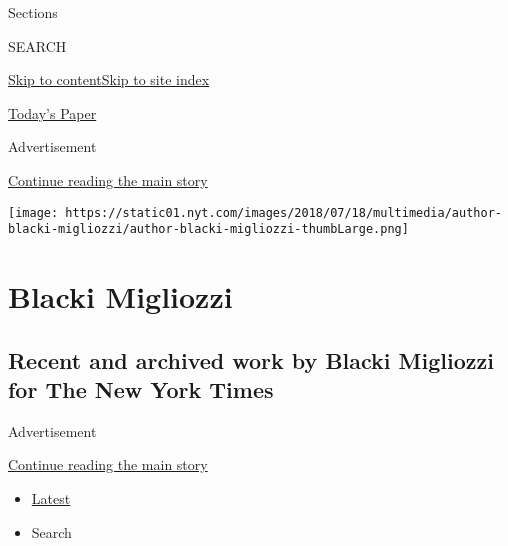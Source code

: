 Sections

SEARCH

\protect\hyperlink{site-content}{Skip to
content}\protect\hyperlink{site-index}{Skip to site index}

\href{https://myaccount.nytimes.com/auth/login?response_type=cookie\&client_id=vi}{}

\href{https://www.nytimes.com/section/todayspaper}{Today's Paper}

Advertisement

\protect\hyperlink{after-top}{Continue reading the main story}

\texttt{[image: https://static01.nyt.com/images/2018/07/18/multimedia/author-blacki-migliozzi/author-blacki-migliozzi-thumbLarge.png]}

\hypertarget{blacki-migliozzi}{%
\section{Blacki Migliozzi}\label{blacki-migliozzi}}

\hypertarget{recent-and-archived-work-by-blacki-migliozzi-for-the-new-york-times}{%
\subsection{Recent and archived work by Blacki Migliozzi for The New
York
Times}\label{recent-and-archived-work-by-blacki-migliozzi-for-the-new-york-times}}

Advertisement

\protect\hyperlink{after-mid1}{Continue reading the main story}

\begin{itemize}
\tightlist
\item
  \protect\hyperlink{stream-panel}{Latest}
\item
  Search
\end{itemize}

